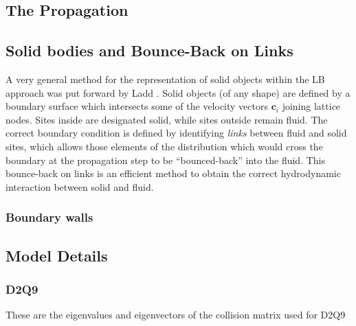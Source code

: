 \subsection{The Propagation}



\subsection{Solid bodies and Bounce-Back on Links}

A very general method for the representation of solid objects
within the LB approach was put forward by Ladd \cite{l94a, l94b}.
Solid objects (of any shape) are defined by a boundary surface
which intersects some of the velocity vectors $\mathbf{c}_i$
joining lattice nodes. Sites inside are designated solid, while
sites outside remain fluid. The correct boundary condition is
defined by identifying \textit{links} between fluid and solid
sites, which allows those elements of the distribution which would
cross the boundary at the propagation step to be ``bounced-back''
into the fluid. This bounce-back on links is an efficient method
to obtain the  correct hydrodynamic interaction between solid
and fluid.

\subsubsection{Boundary walls}

\subsection{Model Details}

\subsubsection{D2Q9}

These are the eigenvalues and eigenvectors of the collision
matrix used for D2Q9


